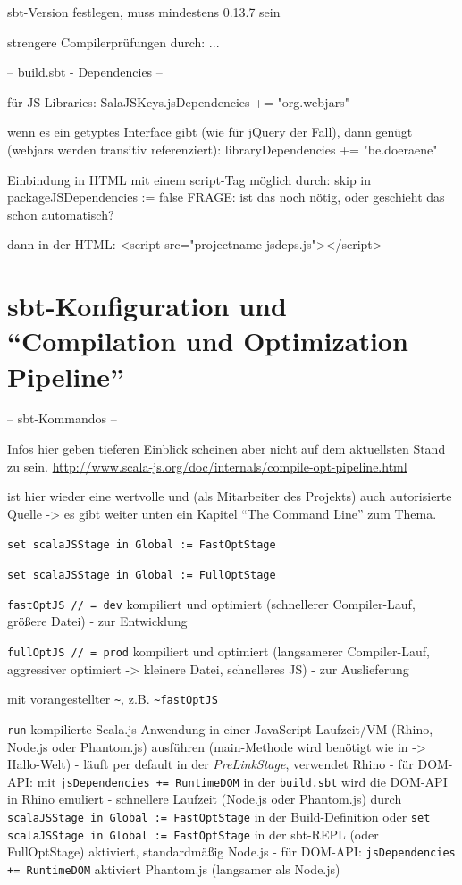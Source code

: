 \documentclass[a4paper, 12pt, listof=totoc, bibliography=totoc]{scrreprt}
\begin{document}

sbt-Version festlegen, muss mindestens 0.13.7 sein


strengere Compilerprüfungen durch: ...


-- build.sbt - Dependencies --

für JS-Libraries:
SalaJSKeys.jsDependencies += "org.webjars" %

wenn es ein getyptes Interface gibt (wie für jQuery der Fall), dann genügt (webjars werden transitiv referenziert):
libraryDependencies += "be.doeraene" %

Einbindung in HTML mit einem script-Tag möglich durch:
skip in packageJSDependencies := false
FRAGE: ist das noch nötig, oder geschieht das schon automatisch?

dann in der HTML:
<script src="projectname-jsdeps.js"></script>


\section{sbt-Konfiguration und "`Compilation und Optimization Pipeline"'}
\label{sec:compiler}

-- sbt-Kommandos --

Infos hier geben tieferen Einblick scheinen aber nicht auf dem aktuellsten Stand zu sein.
\url{http://www.scala-js.org/doc/internals/compile-opt-pipeline.html}

\cite{haoyi.HOS} ist hier wieder eine wertvolle und (als Mitarbeiter des Projekts) auch autorisierte Quelle -> es gibt weiter unten ein Kapitel "`The Command Line"' zum Thema.

\texttt{set scalaJSStage in Global := FastOptStage}

\texttt{set scalaJSStage in Global := FullOptStage}


\texttt{fastOptJS // = dev} kompiliert und optimiert (schnellerer Compiler-Lauf, größere Datei) - zur Entwicklung

\texttt{fullOptJS // = prod} kompiliert und optimiert (langsamerer Compiler-Lauf, aggressiver optimiert -> kleinere Datei, schnelleres JS) - zur Auslieferung

mit vorangestellter  \texttt{\textasciitilde{}}, z.B. \texttt{\textasciitilde{}fastOptJS}

\texttt{run} kompilierte Scala.js-Anwendung in einer JavaScript Laufzeit/VM (Rhino, Node.js oder Phantom.js) ausführen (main-Methode wird benötigt wie in -> Hallo-Welt)
	- läuft per default in der \textit{PreLinkStage}, verwendet Rhino
		- für DOM-API: mit \texttt{jsDependencies += RuntimeDOM} in der \texttt{build.sbt} wird die DOM-API in Rhino emuliert
	- schnellere Laufzeit (Node.js oder Phantom.js) durch \texttt{scalaJSStage in Global := FastOptStage} in der Build-Definition oder \texttt{set scalaJSStage in Global := FastOptStage} in der sbt-REPL (oder FullOptStage) aktiviert, standardmäßig Node.js
		- für DOM-API: \texttt{jsDependencies += RuntimeDOM} aktiviert Phantom.js (langsamer als Node.js)
\end{document}
